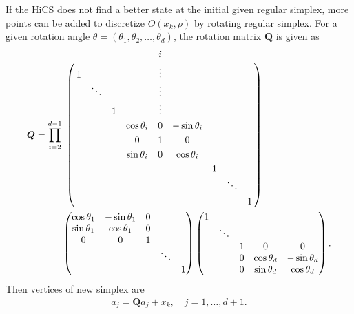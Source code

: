 \documentclass[mathpazo]{csam}
\theoremstyle{remark}
\begin{document}
If the HiCS does not find a better state at the initial given regular
simplex, more points can be added to discretize $O(x_k, \rho)$ by 
rotating regular simplex.
For a given rotation angle
$\theta=(\theta_1,\theta_2,\dots,\theta_{d})$, the
rotation matrix $\bm Q$ is given as 
\begin{equation}
\begin{aligned}
	{\bm Q} = 
	 \prod_{i=2}^{d-1} &
\bordermatrix{
  &  &       &  & 		   & i &		   &  &  & \cr
  & 1&       &  & 		   & \vdots  & 		   &  &  &  \cr
  &  & \ddots&  & 		   & \vdots  & 		   &  &  &  \cr
  &  &       & 1&          & \vdots  & 		   &  &  &  \cr
  &  &       &  & \cos \theta_i & 0 & -\sin \theta_i &  &  &  \cr
  &  &       &  &   0	 & 1 &     0     &  &  & \cr 
  &  &       &  & \sin \theta_i & 0 &  \cos \theta_i &  &  &  \cr
  &  &       &  &          &   &           & 1 & &  \cr
  &  &       &  &          &   &           &  & \ddots &   \cr
  &  &       &  &          &   &           &  &  & 1 
}
\\
	& \begin{pmatrix}
  \cos \theta_1 & -\sin \theta_1 & 0 &  		&   \\
  \sin \theta_1 & \cos \theta_1  & 0 & 	 	& 	\\
  	0	   &      0    & 1 & 		&   \\
  		   & 		   &   & \ddots &   \\
  		   & 		   &   &   		& 1 
	\end{pmatrix}
	\begin{pmatrix}
  1 &  &  &  		&   \\
    & \ddots  &  & 	 	& 	\\
    &    & 1 & 	0	& 0  \\
    &    & 0 & \cos\theta_d & -\sin\theta_d  \\
    & 	 & 0 &  \sin\theta_d & \cos\theta_d 
	\end{pmatrix}.
\end{aligned}
	\label{}
\end{equation}
Then vertices of new simplex are
\begin{align}
	a_j = \bm{Q}a_j + x_k, \quad j = 1,\dots, d+1.
	\label{}
\end{align}
\end{document}
